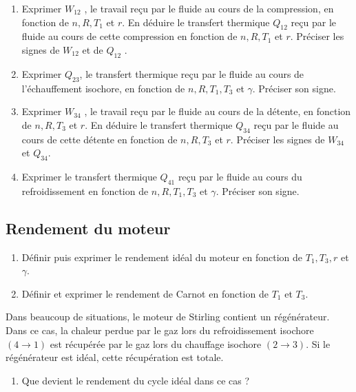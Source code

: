 \documentclass[
  10pt,
  french,
  a4paper,
  DIV=18]{scrartcl}
\providecommand{\tightlist}{%
  \setlength{\itemsep}{0pt}\setlength{\parskip}{0pt}}
\begin{document}
\begin{enumerate}
\def\labelenumi{\arabic{enumi}.}
\setcounter{enumi}{2}
\item
  Exprimer \(W_{12}\) , le travail reçu par le fluide au cours de la
  compression, en fonction de \(n, R, T_1\) et \(r\). En déduire le
  transfert thermique \(Q_{12}\) reçu par le fluide au cours de cette
  compression en fonction de \(n, R, T_1\) et \(r\). Préciser les signes
  de \(W_{12}\) et de \(Q_{12}\) .
\item
  Exprimer \(Q_{23}\), le transfert thermique reçu par le fluide au
  cours de l'échauffement isochore, en fonction de \(n, R, T_1, T_3\) et
  \(\gamma\). Préciser son signe.
\item
  Exprimer \(W_{34}\) , le travail reçu par le fluide au cours de la
  détente, en fonction de \(n, R, T_3\) et \(r\). En déduire le
  transfert thermique \(Q_{34}\) reçu par le fluide au cours de cette
  détente en fonction de \(n, R, T_3\) et \(r\). Préciser les signes de
  \(W_{34}\) et \(Q_{34}\).
\item
  Exprimer le transfert thermique \(Q_{41}\) reçu par le fluide au cours
  du refroidissement en fonction de \(n, R, T_1 , T_3\) et \(\gamma\).
  Préciser son signe.
\end{enumerate}

\subsection*{Rendement du moteur}\label{rendement-du-moteur}

\begin{enumerate}
\def\labelenumi{\arabic{enumi}.}
\setcounter{enumi}{6}
\item
  Définir puis exprimer le rendement idéal du moteur en fonction de
  \(T_1 , T_3 , r\) et \(\gamma\).
\item
  Définir et exprimer le rendement de Carnot en fonction de \(T_1\) et
  \(T_3\).
\end{enumerate}

Dans beaucoup de situations, le moteur de Stirling contient un
régénérateur. Dans ce cas, la chaleur perdue par le gaz lors du
refroidissement isochore \((4 \to 1)\) est récupérée par le gaz lors du
chauffage isochore \((2 \to 3)\). Si le régénérateur est idéal, cette
récupération est totale.

\begin{enumerate}
\def\labelenumi{\arabic{enumi}.}
\setcounter{enumi}{8}
\tightlist
\item
  Que devient le rendement du cycle idéal dans ce cas ?
\end{enumerate}
\end{document}
